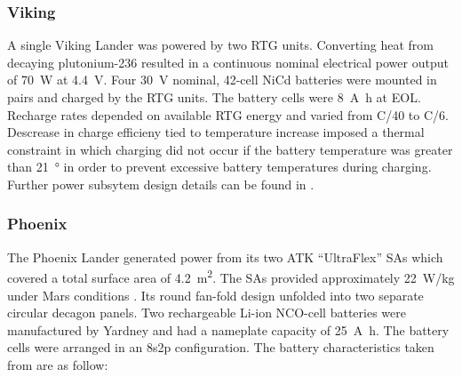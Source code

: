 \subsubsection{Viking}

A single Viking Lander was powered by two \ac{RTG} units. Converting heat from decaying plutonium-236 resulted in a continuous nominal electrical power output of \SI{70}{\watt} at \SI{4.4}{\volt}. Four \SI{30}{\volt} nominal, 42-cell \ac{NiCd} batteries were mounted in pairs and charged by the \ac{RTG} units. The battery cells were \SI{8}{\ampere\hour} at \ac{EOL}. Recharge rates depended on available \ac{RTG} energy and varied from C/40 to C/6. Descrease in charge efficieny tied to temperature increase imposed a thermal constraint in which charging did not occur if the battery temperature was greater than \SI{21}{\degree} in order to prevent excessive battery temperatures during charging. Further power subsytem design details can be found in .


\subsubsection{Phoenix}

The Phoenix Lander generated power from its two ATK ``UltraFlex'' \acp{SA} which covered a total surface area of \SI{4.2}{\meter\squared}. The \acp{SA} provided approximately \SI{22}{\watt/\kilo\gram} under Mars conditions  . Its round fan-fold design unfolded into two separate circular decagon panels. Two rechargeable \ac{Li-ion} \ac{NCO}-cell batteries were manufactured by Yardney and had a nameplate capacity of \SI{25}{\ampere\hour}. The battery cells were arranged in an 8s2p configuration. The battery characteristics taken from  are as follow:

